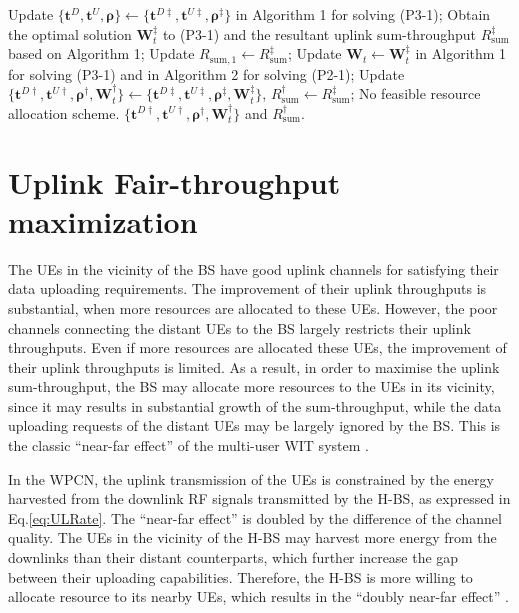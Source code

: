 \documentclass[12pt,draftcls,onecolumn,journal]{IEEEtran}
\begin{document}
\begin{algorithm}[!t]
\begin{algorithmic}[1]
				\STATE Update $\{\mathbf{t}^{D}, \mathbf{t}^{U}, \boldsymbol{\rho}\}\leftarrow \{\mathbf{t}^{D\ddagger}, \mathbf{t}^{U\ddagger}, \boldsymbol{\rho}^{\ddagger}\}$ in Algorithm 1 for solving (P3-1);
				\STATE Obtain the optimal solution $\mathbf{W}_t^{\ddagger}$ to (P3-1) and the resultant uplink sum-throughput $R_{\text{sum}}^{\ddagger}$ based on Algorithm 1;
				\STATE Update $R_{\text{sum},1}\leftarrow R_{\text{sum}}^{\ddagger}$;
				\STATE Update $\mathbf{W}_t \leftarrow \mathbf{W}_t^{\ddagger}$ in Algorithm 1 for solving (P3-1) and in Algorithm 2 for solving (P2-1);
			\ENDWHILE
			\STATE Update $\{\mathbf{t}^{D\dagger}, \mathbf{t}^{U\dagger}, \boldsymbol{\rho}^{\dagger}, \mathbf{W}_t^{\dagger}\} \leftarrow \{\mathbf{t}^{D\ddagger}, \mathbf{t}^{U\ddagger}, \boldsymbol{\rho}^{\ddagger}, \mathbf{W}_t^{\ddagger}\}$, $R_{\text{sum}}^{\dagger}\leftarrow R_{\text{sum}}^{\ddagger}$;
		\ELSE
			\STATE No feasible resource allocation scheme.
		\ENDIF
		\RETURN $\{\mathbf{t}^{D\dagger}, \mathbf{t}^{U\dagger}, \boldsymbol{\rho}^{\dagger}, \mathbf{W}_t^{\dagger}\}$ and $R_{\text{sum}}^{\dagger}$.
	\end{algorithmic}
\end{algorithm}

\section{Uplink Fair-throughput maximization}

The UEs in the vicinity of the BS have good uplink channels for satisfying their data uploading requirements. The improvement of their uplink throughputs is substantial, when more resources are allocated to these UEs. However, the poor channels connecting the distant UEs to the BS largely restricts their uplink throughputs. Even if more resources are allocated these UEs, the improvement of their uplink throughputs is limited. As a result, in order to maximise the uplink sum-throughput, the BS may allocate more resources to the UEs in its vicinity, since it may results in substantial growth of the sum-throughput, while the data uploading requests of the distant UEs may be largely ignored by the BS. This is the classic ``near-far effect'' of the multi-user WIT system \cite{wpcn_1}.

In the WPCN, the uplink transmission of the UEs is constrained by the energy harvested from the downlink RF signals transmitted by the H-BS, as expressed in Eq.\eqref{eq:ULRate}. The ``near-far effect'' is doubled by the difference of the channel quality. The UEs in the vicinity of the H-BS may harvest more energy from the downlinks than their distant counterparts, which further increase the gap between their uploading capabilities. Therefore, the H-BS is more willing to allocate resource to its nearby UEs, which results in the ``doubly near-far effect'' \cite{wpcn_1}. 
\end{document}
